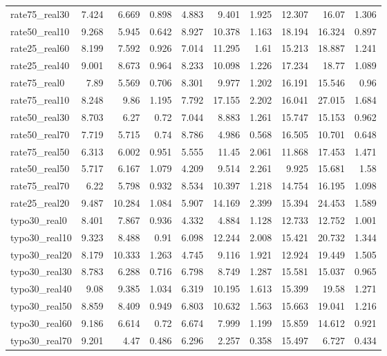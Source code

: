 \documentclass[11pt]{article}
\begin{document}
\begin{table}[H]
\begin{adjustbox}{max width=\textwidth}
\begin{tabular}{lrrrrrrrrr}
rate75\_real30 & 7.424 & 6.669 & 0.898 & 4.883 & 9.401 & 1.925 & 12.307 & 16.07 & 1.306 \\
rate50\_real10 & 9.268 & 5.945 & 0.642 & 8.927 & 10.378 & 1.163 & 18.194 & 16.324 & 0.897 \\
rate25\_real60 & 8.199 & 7.592 & 0.926 & 7.014 & 11.295 & 1.61 & 15.213 & 18.887 & 1.241 \\
rate25\_real40 & 9.001 & 8.673 & 0.964 & 8.233 & 10.098 & 1.226 & 17.234 & 18.77 & 1.089 \\
rate75\_real0 & 7.89 & 5.569 & 0.706 & 8.301 & 9.977 & 1.202 & 16.191 & 15.546 & 0.96 \\
rate75\_real10 & 8.248 & 9.86 & 1.195 & 7.792 & 17.155 & 2.202 & 16.041 & 27.015 & 1.684 \\
rate50\_real30 & 8.703 & 6.27 & 0.72 & 7.044 & 8.883 & 1.261 & 15.747 & 15.153 & 0.962 \\
rate50\_real70 & 7.719 & 5.715 & 0.74 & 8.786 & 4.986 & 0.568 & 16.505 & 10.701 & 0.648 \\
rate75\_real50 & 6.313 & 6.002 & 0.951 & 5.555 & 11.45 & 2.061 & 11.868 & 17.453 & 1.471 \\
rate50\_real50 & 5.717 & 6.167 & 1.079 & 4.209 & 9.514 & 2.261 & 9.925 & 15.681 & 1.58 \\
rate75\_real70 & 6.22 & 5.798 & 0.932 & 8.534 & 10.397 & 1.218 & 14.754 & 16.195 & 1.098 \\
rate25\_real20 & 9.487 & 10.284 & 1.084 & 5.907 & 14.169 & 2.399 & 15.394 & 24.453 & 1.589 \\
typo30\_real0 & 8.401 & 7.867 & 0.936 & 4.332 & 4.884 & 1.128 & 12.733 & 12.752 & 1.001 \\
typo30\_real10 & 9.323 & 8.488 & 0.91 & 6.098 & 12.244 & 2.008 & 15.421 & 20.732 & 1.344 \\
typo30\_real20 & 8.179 & 10.333 & 1.263 & 4.745 & 9.116 & 1.921 & 12.924 & 19.449 & 1.505 \\
typo30\_real30 & 8.783 & 6.288 & 0.716 & 6.798 & 8.749 & 1.287 & 15.581 & 15.037 & 0.965 \\
typo30\_real40 & 9.08 & 9.385 & 1.034 & 6.319 & 10.195 & 1.613 & 15.399 & 19.58 & 1.271 \\
typo30\_real50 & 8.859 & 8.409 & 0.949 & 6.803 & 10.632 & 1.563 & 15.663 & 19.041 & 1.216 \\
typo30\_real60 & 9.186 & 6.614 & 0.72 & 6.674 & 7.999 & 1.199 & 15.859 & 14.612 & 0.921 \\
typo30\_real70 & 9.201 & 4.47 & 0.486 & 6.296 & 2.257 & 0.358 & 15.497 & 6.727 & 0.434 \\
\bottomrule
\end{tabular}
\end{adjustbox}
\end{table}
\end{document}
